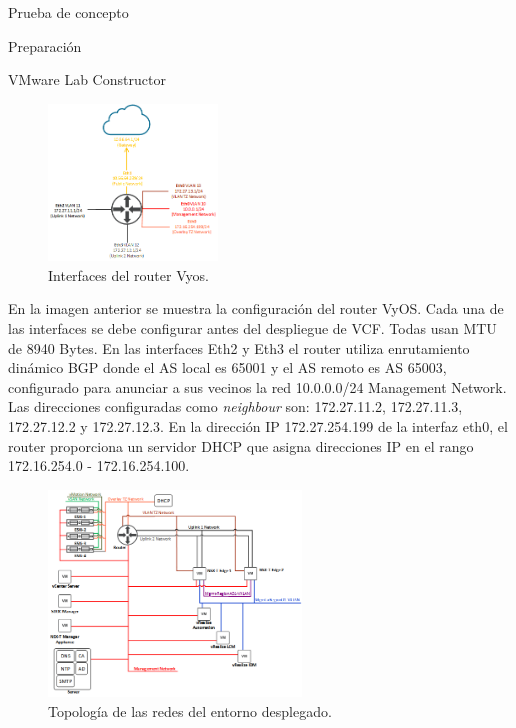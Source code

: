 \begin{section}{Prueba de concepto}
\begin{subsection}{Preparación}
\begin{subsubsection}{VMware Lab Constructor}
    \begin{figure}[h]
      \centering
      \includegraphics[width=0.4\textwidth]{imaxes/pruebaconcepto/RouterFisicoL3.png}
      \caption{Interfaces del router Vyos.}
      \label{fig:interfaces-router-fisico-L3}
    \end{figure}
    \FloatBarrier

    En la imagen anterior se muestra la configuración del router VyOS. Cada una de las interfaces se debe configurar antes del despliegue de VCF. Todas usan MTU de 8940 Bytes. En las interfaces Eth2 y Eth3 el router utiliza enrutamiento dinámico BGP donde el AS local es 65001 y el AS remoto es AS 65003, configurado para anunciar a sus vecinos la red 10.0.0.0/24 Management Network. Las direcciones configuradas como \textit{neighbour} son: 172.27.11.2, 172.27.11.3, 172.27.12.2 y 172.27.12.3. En la dirección IP 172.27.254.199 de la interfaz eth0, el router proporciona un servidor DHCP que asigna direcciones IP en el rango 172.16.254.0 - 172.16.254.100.
    \FloatBarrier

    \begin{figure}[h]
      \centering
      \includegraphics[width=0.6\textwidth]{imaxes/pruebaconcepto/RedDesdeDentro.png}
      \caption{Topología de las redes del entorno desplegado.}
      \label{fig:red-L3-infraestructura-fisica}
    \end{figure}
    \FloatBarrier


\end{subsubsection}
\end{subsection}
\end{section}

